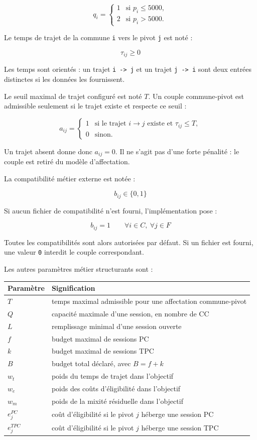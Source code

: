 \documentclass[11pt,a4paper]{article}
\begin{document}
\[
q_i =
\begin{cases}
1 & \text{si } p_i \leq 5000,\\
2 & \text{si } p_i > 5000.
\end{cases}
\]

Le temps de trajet de la commune \texttt{i} vers le pivot \texttt{j} est noté :

\[
\tau_{ij} \geq 0
\]

Les temps sont orientés : un trajet \texttt{i -> j} et un trajet \texttt{j -> i} sont deux entrées distinctes si les données les fournissent.

Le seuil maximal de trajet configuré est noté $T$. Un couple commune-pivot est admissible seulement si le trajet existe et respecte ce seuil :

\[
a_{ij} =
\begin{cases}
1 & \text{si le trajet } i \to j \text{ existe et } \tau_{ij} \leq T,\\
0 & \text{sinon.}
\end{cases}
\]

Un trajet absent donne donc $a_{ij} = 0$. Il ne s'agit pas d'une forte pénalité : le couple est retiré du modèle d'affectation.

La compatibilité métier externe est notée :

\[
b_{ij} \in \{0,1\}
\]

Si aucun fichier de compatibilité n'est fourni, l'implémentation pose :

\[
b_{ij}=1
\qquad
\forall i \in C,\ \forall j \in F
\]

Toutes les compatibilités sont alors autorisées par défaut. Si un fichier est fourni, une valeur \texttt{0} interdit le couple correspondant.

Les autres paramètres métier structurants sont :

\begin{longtable}{|L{0.28\textwidth}|L{0.62\textwidth}|}
\hline
Paramètre & Signification \\
\hline
\endhead
$T$ & temps maximal admissible pour une affectation commune-pivot \\
\hline
$Q$ & capacité maximale d'une session, en nombre de CC \\
\hline
$L$ & remplissage minimal d'une session ouverte \\
\hline
$f$ & budget maximal de sessions PC \\
\hline
$k$ & budget maximal de sessions TPC \\
\hline
$B$ & budget total déclaré, avec $B = f + k$ \\
\hline
$w_t$ & poids du temps de trajet dans l'objectif \\
\hline
$w_e$ & poids des coûts d'éligibilité dans l'objectif \\
\hline
$w_m$ & poids de la mixité résiduelle dans l'objectif \\
\hline
$e_j^{PC}$ & coût d'éligibilité si le pivot $j$ héberge une session PC \\
\hline
$e_j^{TPC}$ & coût d'éligibilité si le pivot $j$ héberge une session TPC \\
\hline
\end{longtable}
\end{document}
